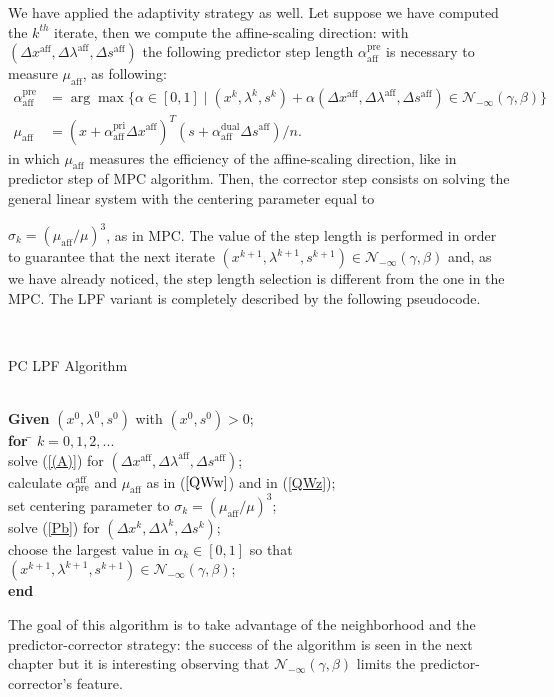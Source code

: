 \documentclass[a4paper,10 pt,titlepage,twoside]{book}
\theoremstyle{plain}
\theoremstyle{definition}
\theoremstyle{remark}
\begin{document}
{{We have applied the adaptivity strategy as well. Let suppose we have computed the $k^{th}$ iterate, then we compute the affine-scaling direction: with $(\Delta x^{\text{aff}},\Delta \lambda^{\text{aff}},\Delta s^{\text{aff}})$ the following predictor step length $\alpha_{\text{aff}}^{\text{pre}}$ is necessary to measure $\mu_{\text{aff}}$, as following:
\begin{align}
\alpha_{\text{aff}}^{\text{pre}}&=\arg\max\{\alpha\in[0,1]\;|\;(x^{k}, \lambda^{k}, s^{k})+ \alpha(\Delta x^{\text{aff}}, \Delta\lambda^{\text{aff}}, \Delta s^{\text{aff}})\in\mathcal{N}_{-\infty}(\gamma,\beta)\}\label{QWw}\tag{4.19}\\
\mu_{\text{aff}}&= (x+\alpha_{\text{aff}}^{\text{pri}}\Delta x^{\text{aff}})^{T}(s+\alpha_{\text{aff}}^{\text{dual}}\Delta s^{\text{aff}})/n.\label{QWz}\tag{4.20}
\end{align}
in which $\mu_{\text{aff}}$ measures the efficiency of the affine-scaling direction, like in predictor step of MPC algorithm.
Then, the corrector step consists on solving the general linear system with the centering parameter equal to \begin{center*}
$\sigma_{k} = (\mu_{\text{aff}}/\mu)^{3}$, as in MPC. The value of the step length is performed in order to guarantee that the next iterate $(x^{k+1}, \lambda^{k+1}, s^{k+1})\in\mathcal{N}_{-\infty}(\gamma,\beta)$ and, as we have already noticed, the step length selection is different from the one in the MPC.\newpage
The LPF variant is completely described by the following pseudocode.
\end{center*}\\
\begin{algorithm}[H]\caption{\label{alg:pc}PC LPF Algorithm}
	\begin{tabbing}
		\\
		\textbf{Given} $(x^{0}, \lambda^{0}, s^{0})$ with $(x^{0}, s^{0})> 0$; \\
		\textbf{for} \= $k = 0, 1, 2,...$ \\
		\> solve (\ref{(A)}) for $(\Delta x^{\text{aff}},\Delta \lambda^{\text{aff}},\Delta s^{\text{aff}})$;\\
		\> calculate $\alpha_{\text{pre}}^{\text{aff}}$ and $\mu_{\text{aff}}$ as in ($\ref{QWw}$) and in (\ref{QWz});\\
		\> set centering parameter to $\sigma_{k} = (\mu_{\text{aff}}/\mu)^{3}$; \\
		\> solve (\ref{Pb}) for $(\Delta x^{k},\Delta \lambda^{k},\Delta s^{k})$;\\
		\> choose the largest value in $\alpha_{k}\in[0,1]$ so that $(x^{k+1}, \lambda^{k+1}, s^{k+1})\in\mathcal{N}_{-\infty}(\gamma,\beta)$;\\
		\textbf{end}
	\end{tabbing}
\end{algorithm}
The goal of this algorithm is to take advantage of the neighborhood and the predictor-corrector strategy: the success of the algorithm is seen in the next chapter but it is interesting observing that $\mathcal{N}_{-\infty}(\gamma,\beta)$ limits the predictor-corrector's feature.
\newpage
}}
\end{document}
